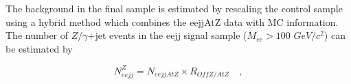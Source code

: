 \documentclass{cmspaper}
\begin{document}
\begin{linenumbers}
%
The background in the final sample is estimated by
rescaling the control sample using a 
hybrid method which combines the eejjAtZ data with 
MC information.  
The number of $Z/\gamma$+jet events in 
the eejj signal sample ($M_{ee}>100$ $GeV/c^2$) can be estimated by

\begin{equation} \label{formula:NeejFromRoffZatZ}
N_{eejj}^{Z} = N_{eejjAtZ} \times R_{OffZ/AtZ} \quad , 
\end{equation}


\end{linenumbers}
\end{document}
